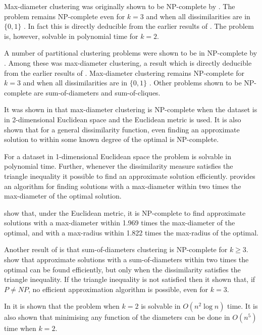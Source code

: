 \documentclass[a4paper]{report}
\begin{document}
Max-diameter clustering was originally shown to be NP-complete by
\citet{brucker1978complexity}.  The problem remains NP-complete even for $k=3$
and when all dissimilarities are in $\{0,1\}$ \citep{gareyjohnson79}.  In fact
this is directly deducible from the earlier results of \citet{sahni1976p}.
The problem is, however, solvable in polynomial time for $k=2$.

A number of partitional clustering problems were shown to be in NP-complete by
\citet{brucker1978complexity}.  Among these was max-diameter clustering, a
result which is directly deducible from the earlier results of
\citet{sahni1976p}.  Max-diameter clustering remains NP-complete for $k=3$ and
when all dissimilarities are in $\{0,1\}$ \citep{gareyjohnson79}.  Other
problems shown to be NP-complete are sum-of-diameters and sum-of-cliques.

It was shown in \citet{gonzalez1985clustering} that max-diameter clustering is
NP-complete when the dataset is in 2-dimensional Euclidean space and the
Euclidean metric is used.  It is also shown that for a general dissimilarity
function, even finding an approximate solution to within some known degree of
the optimal is NP-complete.

For a dataset in 1-dimensional Euclidean space the problem is solvable in
polynomial time.  Further, whenever the dissimilarity measure satisfies the
triangle inequality it possible to find an approximate solution efficiently.
\citet{brucker1978complexity} provides an algorithm for finding solutions with
a max-diameter within two times the max-diameter of the optimal solution.

\citet{bern1996approximation} show that, under the Euclidean metric, it is
NP-complete to find approximate solutions with a max-diameter within 1.969
times the max-diameter of the optimal, and with a max-radius within 1.822
times the max-radius of the optimal.

Another result of \citet{brucker1978complexity} is that sum-of-diameters
clustering is NP-complete for $k \geq 3$.  \citet{doddi2000approximation} show
that approximate solutions with a sum-of-diameters within two times the
optimal can be found efficiently, but only when the dissimilarity satisfies
the triangle inequality.  If the triangle inequality is not satisfied then it
shown that, if $P \neq NP$, no efficient approximation algorithm is possible,
even for $k=3$.

In \citet{hansen87sumofdiameters} it is shown that the problem when $k=2$ is
solvable in $O(n^2 \log n)$ time.  It is also shown that minimising any
function of the diameters can be done in $O(n^5)$ time when $k=2$.
\end{document}
